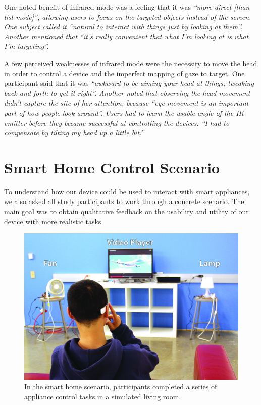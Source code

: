 \documentclass{sigchi}
\newcommand {\studyquote}[1]{\em ``#1''\normalfont}
\begin{document}
One noted benefit of infrared mode was a feeling that it was \studyquote{more direct [than list mode]}, allowing users to focus on the targeted objects instead of the screen. One subject called it \studyquote{natural to interact with things just by looking at them}. Another mentioned that \studyquote{it's really convenient that what I'm looking at is what I'm targeting}. 

A few perceived weaknesses of infrared mode were the necessity to move the head in order to control a device and the imperfect mapping of gaze to target. One participant said that it was \studyquote{awkward to be aiming your head at things, tweaking back and forth to get it right}. Another noted that observing the head movement didn't capture the site of her attention, because \studyquote {eye movement is an important part of how people look around}. Users had to learn the usable angle of the IR emitter before they became successful at controlling the devices: \studyquote{I had to compensate by tilting my head up a little bit.}


\section{Smart Home Control Scenario}
To understand how our device could be used to interact with smart appliances, we also asked all study participants to work through a concrete scenario. The main goal was to obtain qualitative feedback on the usability and utility of our device with more realistic tasks.

\begin{figure}[t]
\centering
\includegraphics[width=1.0\columnwidth]{figures/smarthome-scenario.jpg}
\caption{In the smart home scenario, participants completed a series of appliance control tasks in a simulated living room.}
\label{fig:smarthome}
\end{figure}
\end{document}
